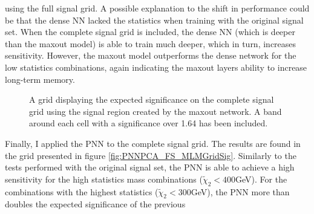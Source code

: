using the full signal grid. A possible explanation to the shift in performance could be that the dense \ac{NN} lacked the statistics when training 
with the original signal set. When the complete signal grid is included, the dense \ac{NN} (which is deeper than the maxout model) is able to train 
much deeper, which in turn, increases sensitivity. However, the maxout model outperforms the dense network for the low statistics combinations, again 
indicating the maxout layers ability to increase long-term memory.\\
\begin{figure}
    \caption{A grid displaying the expected significance on the complete signal grid using the signal region 
    created by the maxout network. A band around each cell with a significance over 1.64 has been included.}
    \label{fig:MaxOutPCA_FS_MLMGridSig}
\end{figure}
Finally, I applied the \ac{PNN} to the complete signal grid. The results are found in the grid presented in figure \ref{fig:PNNPCA_FS_MLMGridSig}.
Similarly to the tests performed with the original signal set, the \ac{PNN} is able to achieve a high sensitivity for the high statistics mass combinations
($\tilde{\chi}_2<400$GeV). For the combinations with the highest statistics ($\tilde{\chi}_2<300$GeV), the \ac{PNN} more than doubles the expected significance of the previous 
